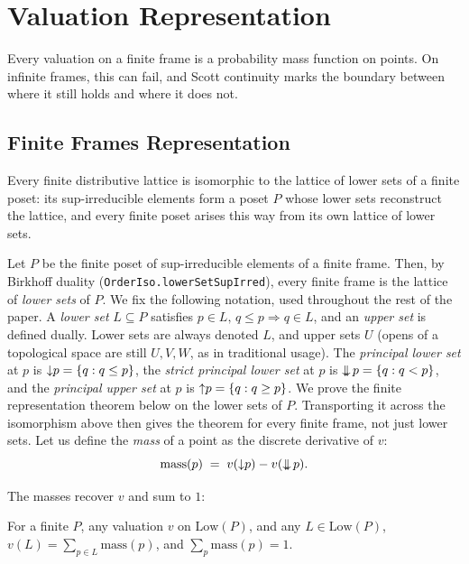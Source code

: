 \section{Valuation Representation}
\label{sec:representation}

Every valuation on a finite frame is a probability mass function on
points. On infinite frames, this can fail, and Scott continuity
marks the boundary between where it still holds and where
it does not.

\subsection{Finite Frames Representation}

\begin{theorem}
Every finite distributive lattice is isomorphic to the lattice of
lower sets of a finite poset: its sup-irreducible elements form a
poset $P$ whose lower sets reconstruct the lattice, and every finite
poset arises this way from its own lattice of lower sets.
\end{theorem}

\noindent
Let $P$ be the finite poset of
sup-irreducible elements of a finite frame.
Then, by Birkhoff duality
(\texttt{OrderIso.lowerSetSupIrred}),
every finite frame is the lattice of \emph{lower sets} of $P$.
We fix the following notation, used throughout the rest of the paper.
A \emph{lower set} $L \subseteq P$ satisfies $p \in L,\, q \le p
\Rightarrow q \in L$, and an \emph{upper set} is defined dually.
Lower sets are always denoted $L$, and upper sets $U$ (opens of a
topological space are still $U, V, W$, as in traditional usage).  The
\emph{principal lower set} at $p$ is ${\downarrow} p = \{q : q \le p\}$, the
\emph{strict principal lower set} at $p$ is
$\mathop{\downarrow\!\!\downarrow} p = \{q : q < p\}$, and the \emph{principal upper set} at
$p$ is ${\uparrow} p = \{q : q \ge p\}$.
We prove the finite representation theorem below on the lower sets of
$P$.
Transporting
it across the isomorphism above then gives the theorem for every
finite frame, not just lower sets.
Let us define the \emph{mass} of a
point as the discrete derivative of $v$:
\[
  \mathrm{mass}(p) \;=\; v({\downarrow} p) - v(\mathop{\downarrow\!\!\downarrow} p).
\]

The masses recover $v$ and sum to $1$:

\begin{theorem}
\label{thm:finite-rep}
For a finite $P$, any valuation $v$ on $\mathrm{Low}(P)$, and any
$L \in \mathrm{Low}(P)$,
$v(L) = \sum_{p \in L} \mathrm{mass}(p)$, and
$\sum_{p} \mathrm{mass}(p) = 1$.
\end{theorem}

